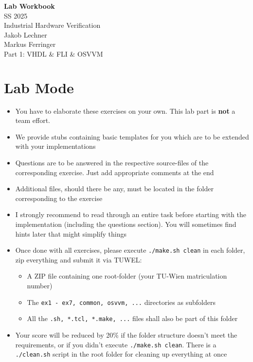 \documentclass[12pt,epsf,makeidx,oneside]{book}
\begin{document}

\setcounter{tocdepth}{3}
\setcounter{secnumdepth}{3}

\begin{titlepage}
  \begin{center}
    \vspace*{4cm}
    \Huge{\bf Lab Workbook}\\
    \Large{SS 2025}\\
    \vspace{1.5cm}
    \Huge{Industrial Hardware Verification}\\
    \vspace{3cm}
    \Large{
      Jakob Lechner \\
      Markus Ferringer \\
    }
    \vspace*{3cm}
    \Huge{
      Part 1: VHDL \& FLI \& OSVVM
    }
  \end{center}
\end{titlepage}

\tableofcontents

\chapter*{Lab Mode}
\begin{itemize}[noitemsep]
  \item You have to elaborate these exercises on your own. This lab part is {\bf not} a team effort.
  \item We provide stubs containing basic templates for you which are to be extended with your implementations
  \item Questions are to be answered in the respective source-files of the corresponding exercise. Just add appropriate comments at the end
  \item Additional files, should there be any, must be located in the folder corresponding to the exercise
  \item I strongly recommend to read through an entire task before starting with the implementation (including the questions section). You will sometimes find hints later that might simplify things
  \item Once done with all exercises, please execute {\tt ./make.sh clean} in each folder, zip everything and submit it via TUWEL:
  \begin{itemize}[noitemsep]
    \item A ZIP file containing one root-folder (your TU-Wien matriculation number)
    \item The {\tt ex1 - ex7, common, osvvm, ...} directories as subfolders
    \item All the {\tt *.sh, *.tcl, *.make, ...} files shall also be part of this folder
  \end{itemize}
  \item Your score will be reduced by 20\% if the folder structure doesn't meet the requirements, or if you didn't execute {\tt ./make.sh clean}. There is a {\tt ./clean.sh} script in the root folder for cleaning up everything at once
\end{itemize}
\end{document}
